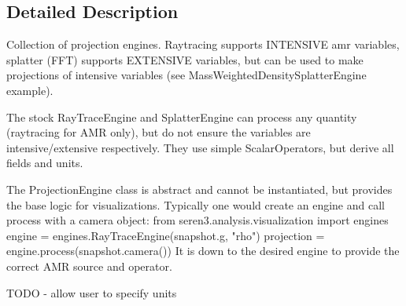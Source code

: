 \subsection{Detailed Description}
\begin{DoxyVerb}
Collection of projection engines. Raytracing supports INTENSIVE amr variables, splatter (FFT) supports
EXTENSIVE variables, but can be used to make projections of intensive variables
(see MassWeightedDensitySplatterEngine example).

The stock RayTraceEngine and SplatterEngine can process any quantity (raytracing for AMR only), but
do not ensure the variables are intensive/extensive respectively. They use simple ScalarOperators,
but derive all fields and units.

The ProjectionEngine class is abstract and cannot be instantiated, but provides the base logic for 
visualizations. Typically one would create an engine and call process with a camera object:
from seren3.analysis.visualization import engines
engine = engines.RayTraceEngine(snapshot.g, "rho")
projection = engine.process(snapshot.camera())
It is down to the desired engine to provide the correct AMR source and operator.

TODO - allow user to specify units
\end{DoxyVerb}
 